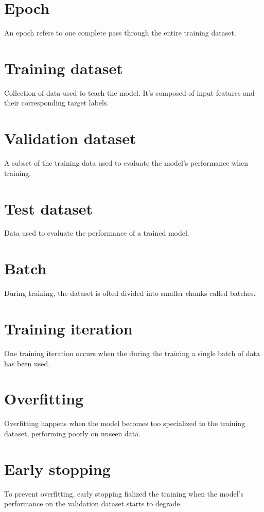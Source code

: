 \section{Epoch}
An epoch refers to one complete pass through the entire training dataset.

\section{Training dataset}
Collection of data used to teach the model. It's composed of input
features and their corresponding target labels.

\section{Validation dataset}
A subset of the training data used to evaluate the model's performance
when training.

\section{Test dataset}
Data used to evaluate the performance of a trained model.

\section{Batch}
During training, the dataset is ofted divided into smaller chunks
called batches.

\section{Training iteration}
One training iteration occurs when the during the training a single
batch of data has been used.

\section{Overfitting}
Overfitting happens when the model becomes too specialized to the
training dataset, performing poorly on unseen data.

\section{Early stopping}
To prevent overfitting, early stopping fialized the training when the
model's performance on the validation dataset starts to degrade.

